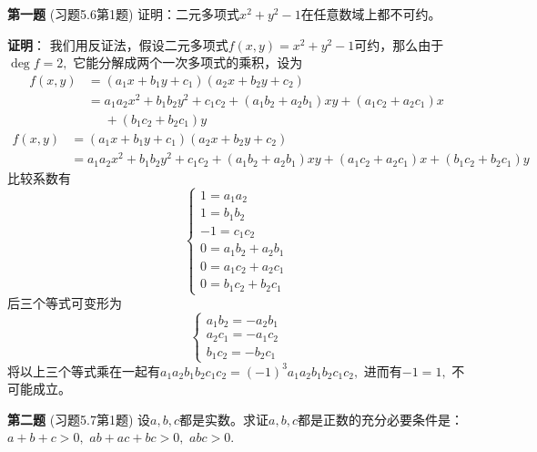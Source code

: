 
\date{2022-12-16 第八次习题课}
\author{}



\maketitle

\ifLargeLayout
\larger[2]
\fi

{\bf 第一题} (习题5.6第1题) 证明：二元多项式$x^2 + y^2 - 1$在任意数域上都不可约。

\ifIncludeAnswer

\newpageorvspace

{\bf 证明}： 我们用反证法，假设二元多项式$f(x, y) = x^2 + y^2 - 1$可约，那么由于$\deg f = 2,$ 它能分解成两个一次多项式的乘积，设为
\ifLargeLayout
\begin{align*}
f(x, y) & = (a_1x + b_1y + c_1)(a_2x + b_2y + c_2) \\
& = a_1a_2 x^2 + b_1b_2 y^2 + c_1c_2 + (a_1b_2 + a_2b_1)xy + (a_1c_2 + a_2c_1)x \\
& \phantom{=} + (b_1c_2 + b_2c_1)y
\end{align*}
\else  %
\begin{align*}
f(x, y) & = (a_1x + b_1y + c_1)(a_2x + b_2y + c_2) \\
& = a_1a_2 x^2 + b_1b_2 y^2 + c_1c_2 + (a_1b_2 + a_2b_1)xy + (a_1c_2 + a_2c_1)x + (b_1c_2 + b_2c_1)y
\end{align*}
\fi  %
比较系数有
$$
\begin{cases}
1 = a_1a_2 \\
1 = b_1b_2 \\
-1 = c_1c_2 \\
0 = a_1b_2 + a_2b_1 \\
0 = a_1c_2 + a_2c_1 \\
0 = b_1c_2 + b_2c_1
\end{cases}
$$
后三个等式可变形为
$$
\begin{cases}
a_1b_2 = - a_2b_1 \\
a_2c_1 = - a_1c_2 \\
b_1c_2 = - b_2c_1
\end{cases}
$$
将以上三个等式乘在一起有$a_1a_2b_1b_2c_1c_2 = (-1)^3 a_1a_2b_1b_2c_1c_2,$ 进而有$-1 = 1,$ 不可能成立。

\fi  %

\newpageorvspace

{\bf 第二题} (习题5.7第1题) 设$a, b, c$都是实数。求证$a, b, c$都是正数的充分必要条件是：$a + b + c > 0,$ $ab + ac + bc > 0,$ $abc > 0.$

